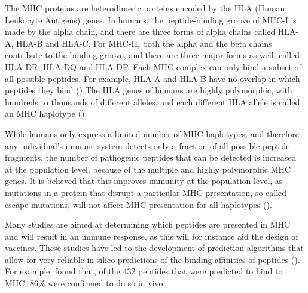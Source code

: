 
The MHC proteins are heterodimeric proteins encoded by the
HLA (Human Leukocyte Antigens) genes.
In humans, the peptide-binding groove of MHC-I is made by the alpha chain, and there are three forms of alpha chains called HLA-A, HLA-B and HLA-C. 
For MHC-II, both the alpha and the beta chains contribute to the binding groove, and there are three major forms as well, called HLA-DR, HLA-DQ and HLA-DP.
Each MHC complex can only bind a subset of all possible peptides.
For example, HLA-A and HLA-B have no overlap in which
peptides they bind (\cite{lund2004definition})
The HLA genes of humans are highly polymorphic, with hundreds 
to thousands of different alleles, 
and each different HLA allele is called 
an MHC haplotype (\cite{marsh2010nomenclature}).


While humans only express a limited number of MHC haplotypes, and therefore any individual's immune system detects only a fraction of all possible
peptide fragments, the number of pathogenic peptides that can be detected is increased at the population level, because of the multiple and highly polymorphic MHC genes.
It is believed that this improves immunity at the population level, 
as mutations in a protein that disrupt a particular MHC presentation, 
so-called escape mutations, 
will not affect MHC presentation for all haplotypes (\cite{sommer2005importance}).


Many studies are aimed at determining which peptides are presented in MHC 
and will result in an immune response, 
as this will for instance aid the design of vaccines. 
These studies have led to the development 
of  prediction algorithms 
that allow for very reliable in silico predictions 
of the binding affinities of peptides (\cite{larsen2010identification,schellens2008unanticipated,tang2011genome}).
For example, \cite{tang2011genome} found that, 
of the 432 peptides that were predicted to bind to MHC,
86\% were confirmed to do so in vivo.

